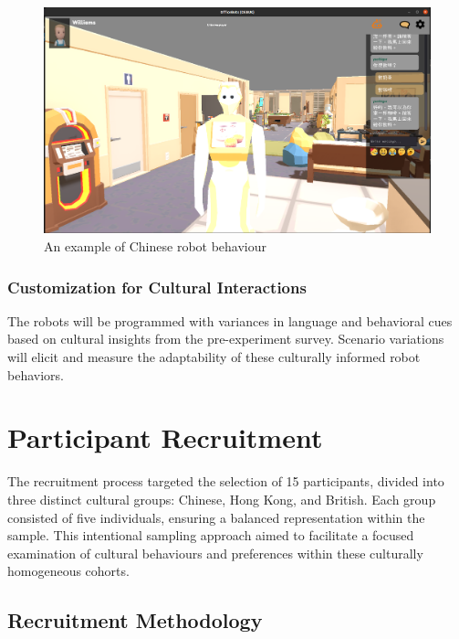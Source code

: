 \begin{figure}
    \begin{center}
        \noindent\includegraphics[width=\linewidth]{Chapter4/robot2.png}  
        \caption{An example of Chinese robot behaviour}
        \label{fig:figure1}
    \end{center}
\end{figure}

\subsubsection{Customization for Cultural Interactions}

The robots will be programmed with variances in language and behavioral cues based on cultural insights from the pre-experiment survey. Scenario variations will elicit and measure the adaptability of these culturally informed robot behaviors.


\section{Participant Recruitment}

The recruitment process targeted the selection of 15 participants, divided into three distinct cultural groups: Chinese, Hong Kong, and British. Each group consisted of five individuals, ensuring a balanced representation within the sample. This intentional sampling approach aimed to facilitate a focused examination of cultural behaviours and preferences within these culturally homogeneous cohorts.

\subsection{Recruitment Methodology}

